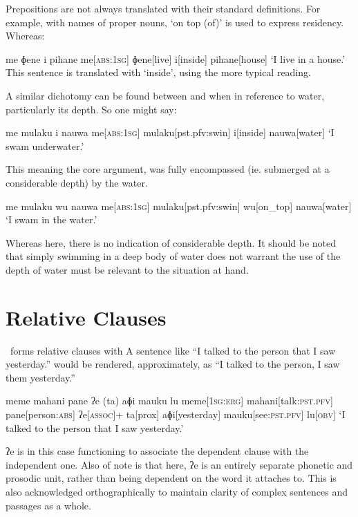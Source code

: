 Prepositions are not always translated with their standard definitions. For example, with names of proper nouns,  `on top (of)' is used to express residency. Whereas:

\ex
\begingl
\glpreamble me ɸene i pihane
\endpreamble
me[\textsc{abs:1sg}]
ɸene[live]
i[inside]
pihane[house]
\glft `I live in a house.'
\endgl
\xe
This sentence is translated with  `inside', using the more typical reading.

A similar dichotomy can be found between  and  when in reference to water, particularly its depth. So one might say:

\ex
\begingl
\glpreamble me mulaku i nauwa
\endpreamble
me[\textsc{abs:1sg}]
mulaku[pst.pfv:swin]
i[inside]
nauwa[water]
\glft `I swam underwater.'
\endgl
\xe

This meaning the core argument,  was fully encompassed (ie. submerged at a considerable depth) by the water.

\ex
\begingl
\glpreamble me mulaku wu nauwa
\endpreamble
me[\textsc{abs:1sg}]
mulaku[pst.pfv:swin]
wu[on\_top]
nauwa[water]
\glft `I swam in the water.'
\endgl
\xe

Whereas here, there is no indication of considerable depth. It should be noted that simply swimming in a deep body of water does not warrant the use of  the depth of water must be relevant to the situation at hand.

\section{Relative Clauses}

\langname\ forms relative clauses with  A sentence like ``I talked to the person that I saw yesterday.'' would be rendered, approximately, as ``I talked to the person, I saw them yesterday.''

\ex
\begingl
\glpreamble meme mahani pane ʔe (ta) aɸi mauku lu
\endpreamble
meme[\textsc{1sg:erg}]
mahani[talk\textsc{:pst.pfv}]
pane[person\textsc{:abs}]
ʔe[\textsc{assoc}]+
\nogloss{\lbrack}
ta[prox]
aɸi[yesterday]
mauku[see\textsc{:pst.pfv}]
lu[\textsc{obv}]
\nogloss{\rbrack}
\glft `I talked to the person that I saw yesterday.'
\endgl
\xe

ʔe is in this case functioning to associate the dependent clause with the independent one. Also of note is that here, ʔe is an entirely separate phonetic and prosodic unit, rather than being dependent on the word it attaches to. This is also acknowledged orthographically to maintain clarity of complex sentences and passages as a whole.
